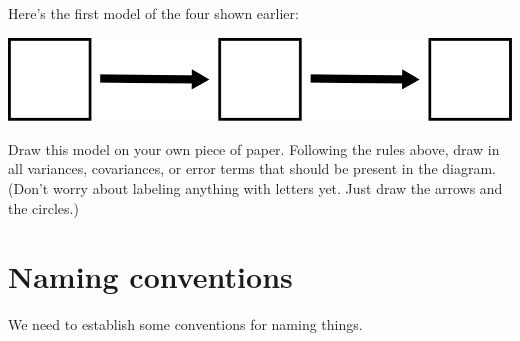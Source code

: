 \documentclass[
]{book}
\begin{document}
Here's the first model of the four shown earlier:

\begin{center}\includegraphics{graphics/mediator_right} \end{center}

Draw this model on your own piece of paper. Following the rules above, draw in all variances, covariances, or error terms that should be present in the diagram. (Don't worry about labeling anything with letters yet. Just draw the arrows and the circles.)

\hypertarget{mediation-naming}{%
\section{Naming conventions}\label{mediation-naming}}

We need to establish some conventions for naming things.
\end{document}
